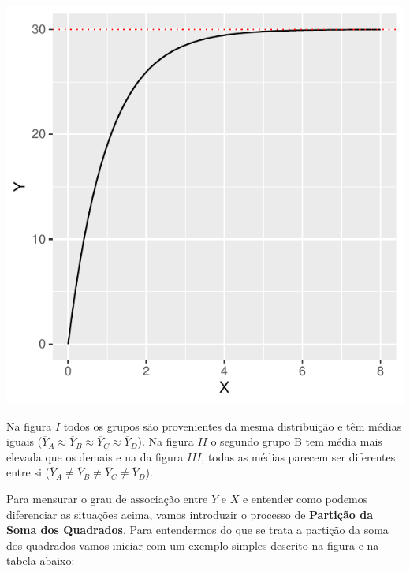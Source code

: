 \documentclass[
]{book}
\begin{document}
\begin{center}\includegraphics{probest-cambientais_files/figure-latex/unnamed-chunk-223-1} \end{center}

Na figura \(I\) todos os grupos são provenientes da mesma distribuição e têm médias iguais (\(\overline{Y}_A \approx \overline{Y}_B \approx \overline{Y}_C \approx \overline{Y}_D\)). Na figura \(II\) o segundo grupo B tem média mais elevada que os demais e na da figura \(III\), todas as médias parecem ser diferentes entre si (\(\overline{Y}_A \ne \overline{Y}_B \ne \overline{Y}_C \ne \overline{Y}_D\)).

Para mensurar o grau de associação entre \(Y\) e \(X\) e entender como podemos diferenciar as situações acima, vamos introduzir o processo de \textbf{Partição da Soma dos Quadrados}. Para entendermos do que se trata a partição da soma dos quadrados vamos iniciar com um exemplo simples descrito na figura e na tabela abaixo:
\end{document}
